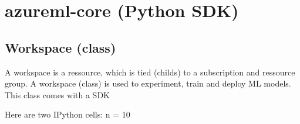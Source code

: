 \section{azureml-core (Python SDK)}
\subsection{Workspace (class)}

A workspace is a ressource, which is tied (childs) to a subscription and ressource group. A workspace (class) is used to experiment, train and deploy \gls{ML} models. This class comes with a \gls{SDK}

Here are two IPython cells:
n = 10



